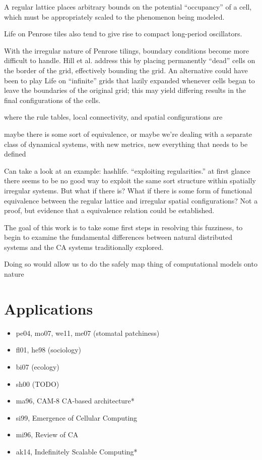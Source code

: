 A regular lattice places arbitrary bounds on the potential ``occupancy'' of a cell, which must be appropriately scaled to the phenomenon being modeled. 


Life on Penrose tiles also tend to give rise to compact long-period oscillators.

With the irregular nature of Penrose tilings, boundary conditions become more difficult to handle. Hill et al. address this by placing permanently “dead” cells on the border of the grid, effectively bounding the grid. An alternative could have been to play Life on “infinite” grids that lazily expanded whenever cells began to leave the boundaries of the original grid; this may yield differing results in the final configurations of the cells.


where the rule tables, local connectivity, and spatial configurations are

maybe there is some sort of equivalence, or maybe we're dealing with a separate class of dynamical systems, with new metrics, new everything that needs to be defined

Can take a look at an example: hashlife. ``exploiting regularities.'' at first glance there seems to be no good way to exploit the same sort structure within spatially irregular systems. But what if there is? What if there is some form of functional equivalence between the regular lattice and irregular spatial configurations? Not a proof, but evidence that a equivalence relation could be established. 

The goal of this work is to take some first steps in resolving this fuzziness, to begin to examine the fundamental differences between natural distributed systems and the CA systems traditionally explored. 

Doing so would allow us to do the safely map thing of computational models onto nature

\makeatletter
\def\@makechapterhead#1{%
  \vspace*{50\p@}%
  {\parindent \z@ \raggedright \normalfont
    \interlinepenalty\@M
    \Huge\bfseries  \thechapter.\quad #1\par\nobreak
    \vskip 40\p@
  }}
\makeatother

\section{Applications}
\begin{itemize}
\item pe04, mo07, we11, me07 (stomatal patchiness)

\item fl01, he98 (sociology)
\item bi07 (ecology)
\item sh00 (TODO)

\item ma96, CAM-8 CA-based architecture*
\item si99, Emergence of Cellular Computing
\item mi96, Review of CA
\item ak14, Indefinitely Scalable Computing*
\end{itemize}

